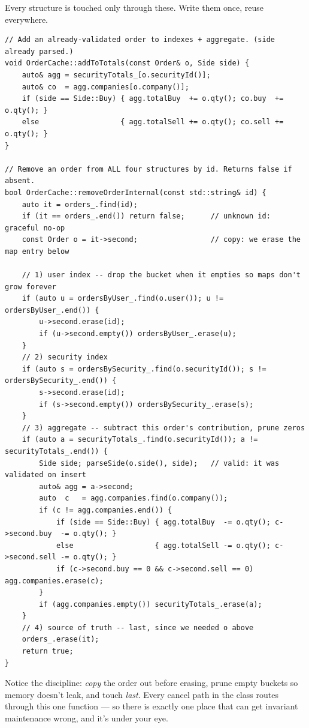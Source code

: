 Every structure is touched only through these. Write them once, reuse everywhere.

\begin{lstlisting}
// Add an already-validated order to indexes + aggregate. (side already parsed.)
void OrderCache::addToTotals(const Order& o, Side side) {
    auto& agg = securityTotals_[o.securityId()];
    auto& co  = agg.companies[o.company()];
    if (side == Side::Buy) { agg.totalBuy  += o.qty(); co.buy  += o.qty(); }
    else                   { agg.totalSell += o.qty(); co.sell += o.qty(); }
}

// Remove an order from ALL four structures by id. Returns false if absent.
bool OrderCache::removeOrderInternal(const std::string& id) {
    auto it = orders_.find(id);
    if (it == orders_.end()) return false;      // unknown id: graceful no-op
    const Order o = it->second;                 // copy: we erase the map entry below

    // 1) user index -- drop the bucket when it empties so maps don't grow forever
    if (auto u = ordersByUser_.find(o.user()); u != ordersByUser_.end()) {
        u->second.erase(id);
        if (u->second.empty()) ordersByUser_.erase(u);
    }
    // 2) security index
    if (auto s = ordersBySecurity_.find(o.securityId()); s != ordersBySecurity_.end()) {
        s->second.erase(id);
        if (s->second.empty()) ordersBySecurity_.erase(s);
    }
    // 3) aggregate -- subtract this order's contribution, prune zeros
    if (auto a = securityTotals_.find(o.securityId()); a != securityTotals_.end()) {
        Side side; parseSide(o.side(), side);   // valid: it was validated on insert
        auto& agg = a->second;
        auto  c   = agg.companies.find(o.company());
        if (c != agg.companies.end()) {
            if (side == Side::Buy) { agg.totalBuy  -= o.qty(); c->second.buy  -= o.qty(); }
            else                   { agg.totalSell -= o.qty(); c->second.sell -= o.qty(); }
            if (c->second.buy == 0 && c->second.sell == 0) agg.companies.erase(c);
        }
        if (agg.companies.empty()) securityTotals_.erase(a);
    }
    // 4) source of truth -- last, since we needed o above
    orders_.erase(it);
    return true;
}
\end{lstlisting}

\begin{intu}
Notice the discipline: \emph{copy} the order out before erasing, prune empty
buckets so memory doesn't leak, and touch  \emph{last}. Every
cancel path in the class routes through this one function --- so there is exactly
one place that can get invariant maintenance wrong, and it's under your eye.
\end{intu}

